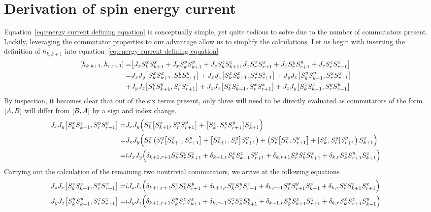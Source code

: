 \chapter{Derivation of spin energy current\label{app:spin energy current derivation}}
\thispagestyle{chapterBeginStyle}

Equation~\eqref{eq:energy current defining equation} is
conceptually simple, yet quite tedious to solve due to the number of commutators present. Luckily, leveraging the commutator properties
to our advantage allow us to simplify the calculations. Let us begin with inserting the definition of \(h_{k,k+1}\) into 
equation~\eqref{eq:energy current defining equation}
\begin{align}
    \comm{h_{k,k+1}}{h_{r,r+1}} =& \comm{J_{x} \Sx_{k}\Sx_{k+1} + J_{x} \Sy_{k}\Sy_{k+1} + J_{z} \Sz_{k}\Sz_{k+1}}{J_{x} \Sx_{r}\Sx_{r+1} + J_{x} \Sy_{r}\Sy_{r+1} + J_{z} \Sz_{r}\Sz_{r+1}}\nonumber\\
    =& J_{x} J_{y}\comm{\Sx_{k}\Sx_{k+1}}{\Sy_{r}\Sy_{r+1}} + J_{x} J_{z}\comm{\Sx_{k}\Sx_{k+1}}{\Sz_{r}\Sz_{r+1}} + J_{y} J_{x}\comm{\Sy_{k}\Sy_{k+1}}{\Sx_{r}\Sx_{r+1}}\nonumber\\
    +& J_{y} J_{z}\comm{\Sy_{k}\Sy_{k+1}}{\Sz_{r}\Sz_{r+1}} + J_{z} J_{x}\comm{\Sz_{k}\Sz_{k+1}}{\Sx_{r}\Sx_{r+1}} + J_{z} J_{y}\comm{\Sz_{k}\Sz_{k+1}}{\Sy_{r}\Sy_{r+1}}  
\end{align}
By inspection, it becomes clear that out of the six terms present, only three will need to be directly evaluated as commutators of the form
\(\comm{A}{B}\) will differ from \(\comm{B}{A}\) by a sign and index change.
\begin{align}
    J_{x} J_{y}\comm{\Sx_{k}\Sx_{k+1}}{\Sy_{r}\Sy_{r+1}} =& J_x J_y \Big(\Sx_k\comm{\Sx_{k+1}}{\Sy_{r}\Sy_{r+1}} + \comm{\Sx_{k}}{\Sy_{r}\Sy_{r+1}} \Sx_{k+1} \Big)\\
    =& J_x J_y \Big( \Sx_k \left( \Sy_r \comm{\Sx_{k+1}}{\Sy_{r+1}} + \comm{\Sx_{k+1}}{\Sy_{r}} \Sy_{r+1}\right) + 
    \left( \Sy_r \comm{\Sx_{k}}{\Sy_{r+1}} + \comm{\Sx_{k}}{\Sy_{r}} \Sy_{r+1} \right)\Sx_{k+1} \Big)\nonumber\\
    =& i J_x J_y \Big( \delta_{k+1,r+1} \Sx_k \Sy_r \Sz_{k+1} + \delta_{k+1,r} \Sx_k \Sz_{k+1} \Sy_{r+1} + \delta_{k,r+1} \Sy_r \Sz_k \Sx_{k+1} +\delta_{k,r} \Sz_k \Sy_{r+1} \Sx_{k+1}\Big)\nonumber
\end{align}
Carrying out the calculation of the remaining two nontrivial commutators, we arrive at the following equations
\begin{align*}
    J_{z} J_{x}\comm{\Sz_{k}\Sz_{k+1}}{\Sx_{r}\Sx_{r+1}} =& i J_z J_x \Big( \delta_{k+1,r+1} \Sx_r \Sz_k \Sy_{r+1} + \delta_{k+1,r} \Sz_k \Sy_{r} \Sx_{r+1} + \delta_{k,r+1} \Sx_r \Sy_{r+1} \Sz_{k+1} +\delta_{k,r} \Sy_r \Sz_{k+1} \Sx_{r+1}\Big)\\ 
    J_{y} J_{z}\comm{\Sy_{k}\Sy_{k+1}}{\Sz_{r}\Sz_{r+1}} =& i J_y J_z \Big( \delta_{k+1,r+1} \Sy_k \Sz_r \Sx_{k+1} + \delta_{k,r+1} \Sz_r \Sx_{k} \Sy_{k+1} + \delta_{k+1,r} \Sy_k \Sx_{k+1} \Sz_{r+1} +\delta_{k,r} \Sx_k \Sz_{r+1} \Sy_{k+1}\Big) 
\end{align*}
